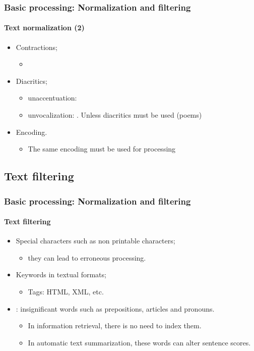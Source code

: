 \documentclass[xcolor=table]{beamer}
\begin{document}
\begin{frame}
\frametitle{Basic processing: Normalization and filtering}
\framesubtitle{Text normalization (2)}

\begin{itemize}
	
	\item Contractions;
	\begin{itemize}
		\item {}
	\end{itemize}
	
	\item Diacritics;
	\begin{itemize}
		\item unaccentuation:  
		\item unvocalization:  . Unless diacritics must be used (poems)
	\end{itemize}

	\item Encoding.
	\begin{itemize}
		\item The same encoding must be used for processing
	\end{itemize}

\end{itemize}

\end{frame}

\subsection{Text filtering}

\begin{frame}
\frametitle{Basic processing: Normalization and filtering}
\framesubtitle{Text filtering}

\begin{itemize}
	\item Special characters such as non printable characters;
	\begin{itemize}
		\item they can lead to erroneous processing. 
	\end{itemize}
	\item Keywords in textual formats;
	\begin{itemize}
		\item Tags: HTML, XML, etc. 
	\end{itemize}
	\item {}: insignificant words such as prepositions, articles and pronouns.
	\begin{itemize}
		\item In information retrieval, there is no need to index them.
		\item In automatic text summarization, these words can alter sentence scores.
	\end{itemize}
\end{itemize}

\end{frame}
\end{document}
